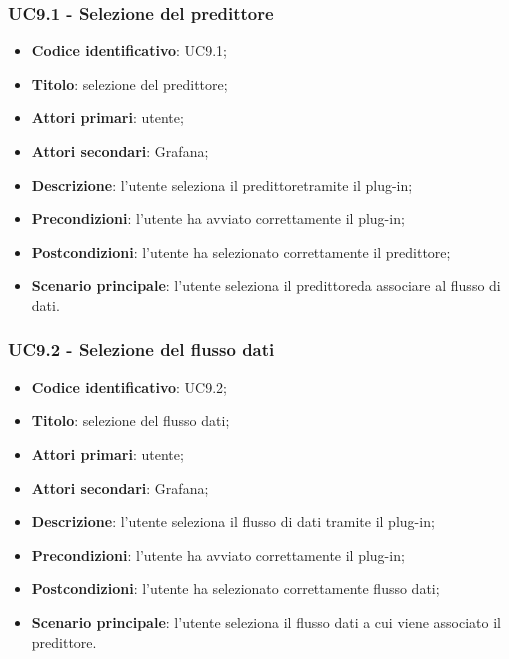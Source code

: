 \subsubsection{UC9.1 - Selezione del predittore}
\begin{itemize}
	\item \textbf{Codice identificativo}: UC9.1;
	\item \textbf{Titolo}: selezione del predittore\glo;
	\item \textbf{Attori primari}: utente;
	\item \textbf{Attori secondari}: Grafana\glo;
	\item \textbf{Descrizione}: l'utente seleziona il predittore\glosp tramite il plug-in;
	\item \textbf{Precondizioni}: l'utente ha avviato correttamente il plug-in;
	\item \textbf{Postcondizioni}: l'utente ha selezionato correttamente il predittore\glo;
	\item \textbf{Scenario principale}: l'utente seleziona il predittore\glosp da associare al flusso di dati.
\end{itemize}

\subsubsection{UC9.2 - Selezione del flusso dati}
\begin{itemize}
	\item \textbf{Codice identificativo}: UC9.2;
	\item \textbf{Titolo}: selezione del flusso dati;
	\item \textbf{Attori primari}: utente;
	\item \textbf{Attori secondari}: Grafana\glo;
	\item \textbf{Descrizione}: l'utente seleziona il flusso di dati tramite il plug-in;
	\item \textbf{Precondizioni}: l'utente ha avviato correttamente il plug-in;
	\item \textbf{Postcondizioni}: l'utente ha selezionato correttamente flusso dati;
	\item \textbf{Scenario principale}: l'utente seleziona il flusso dati a cui viene associato il predittore\glo.
\end{itemize}

